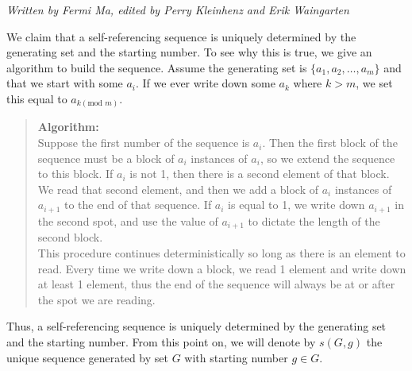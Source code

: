 \documentclass[runningheads,a4paper]{llncs}
\begin{document}
\emph{Written by Fermi Ma, edited by Perry Kleinhenz and Erik Waingarten}

We claim that a self-referencing sequence is uniquely determined by the generating set and the starting number. To see why this is true, we give an algorithm to build the sequence. Assume the generating set is $\{a_1,a_2,\dots,a_m\}$ and that we start with some $a_i$. If we ever write down some $a_k$ where $k > m$, we set this equal to $a_{k (\text{mod } m)}$.
\begin{quote}
\textbf{Algorithm:}\\
Suppose the first number of the sequence is $a_i$. Then the first block of the sequence must be a block of $a_i$ instances of $a_i$, so we extend the sequence to this block. If $a_i$ is not 1, then there is a second element of that block. We read that second element, and then we add a block of $a_i$ instances of $a_{i+1}$ to the end of that sequence. If $a_i$ is equal to 1, we write down $a_{i+1}$ in the second spot, and use the value of $a_{i+1}$ to dictate the length of the second block.\\

This procedure continues deterministically so long as there is an element to read. Every time we write down a block, we read 1 element and write down at least 1 element, thus the end of the sequence will always be at or after the spot we are reading.
\end{quote}

Thus, a self-referencing sequence is uniquely determined by the generating set and the starting number. From this point on, we will denote by $s(G,g)$ the unique sequence generated by set $G$ with starting number $g \in G$.
\end{document}
